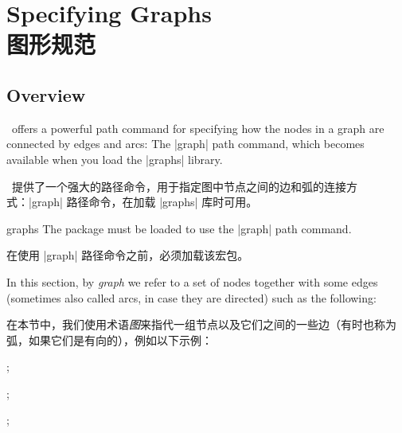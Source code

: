 %
%
%


\section{Specifying Graphs\\图形规范}
\label{section-library-graphs}

\subsection{Overview}

\tikzname\ offers a powerful path command for specifying how the nodes in a
graph are connected by edges and arcs: The |graph| path command, which becomes
available when you load the |graphs| library.

\tikzname\ 提供了一个强大的路径命令，用于指定图中节点之间的边和弧的连接方式：|graph| 路径命令，在加载 |graphs| 库时可用。

\begin{tikzlibrary}{graphs}
    The package must be loaded to use the |graph| path command.

    在使用 |graph| 路径命令之前，必须加载该宏包。
  \end{tikzlibrary}

In this section, by \emph{graph} we refer to a set of nodes together with some
edges (sometimes also called arcs, in case they are directed) such as the
following:

在本节中，我们使用术语\emph{图}来指代一组节点以及它们之间的一些边（有时也称为弧，如果它们是有向的），例如以下示例：

%
\begin{codeexample}[preamble={\usetikzlibrary{graphs}}]
\tikz {};
\end{codeexample}

\begin{codeexample}[preamble={\usetikzlibrary{graphs.standard}}]
\tikz {};
\end{codeexample}

\begin{codeexample}[preamble={\usetikzlibrary{graphs}}]
\tikz
  ;
\end{codeexample}

